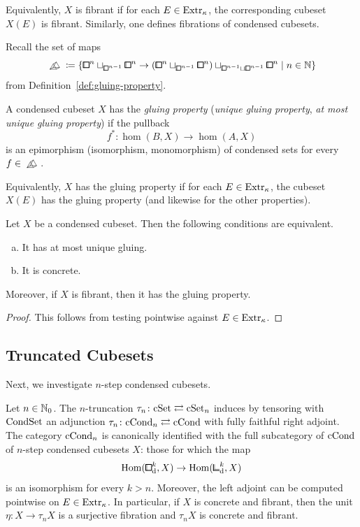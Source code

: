 Equivalently, $X$ is fibrant if for each $E\in\mathrm{Extr}_\kappa$, the corresponding cubeset $X(E)$ is fibrant.
Similarly, one defines fibrations of condensed cubesets.

Recall the set of maps
\[
    \bprism\coloneq \{ {{\bbox}^{n}\sqcup_{{\bbox}^{n-1}}{\bbox}^{n}}\to{({\bbox}^{n}\sqcup_{{\bbox}^{n-1}}{\bbox}^{n})\sqcup_{{\bbox}^{n-1}\sqcup{\bbox}^{n-1}}{\bbox}^n} \mid n\in\N \}
\]
from Definition~\ref{def:gluing-property}.

\begin{definition}
A condensed cubeset $X$ has the \emph{gluing property} (\emph{unique gluing property}, \emph{at most unique gluing property}) if the pullback
\[
    f^\ast\colon\hom(B,X)\to\hom(A,X)
\]
is an epimorphism (isomorphism, monomorphism) of condensed sets for every $f\in\bprism$.
\end{definition}

Equivalently, $X$ has the gluing property if for each $E\in\mathrm{Extr}_\kappa$, the cubeset $X(E)$ has the gluing property (and likewise for the other properties).

\begin{proposition}
Let $X$ be a condensed cubeset.
Then the following conditions are equivalent.
\begin{enumerate}[(a)]
    \item It has at most unique gluing.
    \item It is concrete.
\end{enumerate}
Moreover, if $X$ is fibrant, then it has the gluing property.
\end{proposition}

\begin{proof}
This follows from testing pointwise against $E\in\mathrm{Extr}_\kappa$.
\end{proof}


\subsection{Truncated Cubesets}

Next, we investigate $n$-step condensed cubesets.

\begin{proposition}
Let $n\in{\mathbb{N}}_0$.
The $n$-truncation $\tau_n\colon\mathrm{cSet}\rightleftarrows\mathrm{cSet}_n$ induces by tensoring with $\mathrm{CondSet}$ an adjunction
$\tau_n\colon\mathrm{cCond}_n\rightleftarrows\mathrm{cCond}$ with fully faithful right adjoint.
The category $\mathrm{cCond}_n$ is canonically identified with the full subcategory of $\mathrm{cCond}$ of $n$-step condensed cubesets $X$:
those for which the map
\[
    \hom({\bbox}^k_\ud,X)\to\hom({\bbcor}^k_\ud,X)
\]
is an isomorphism for every $k>n$.
Moreover, the left adjoint can be computed pointwise on $E\in\mathrm{Extr}_\kappa$.
In particular, if $X$ is concrete and fibrant, then the unit $\eta\colon X\to\tau_n X$ is a surjective fibration
and $\tau_n X$ is concrete and fibrant.
\end{proposition}

